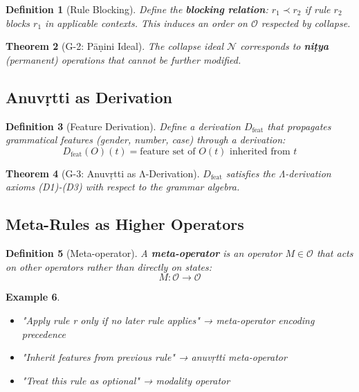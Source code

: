 \documentclass[12pt, oneside]{article}
\newtheorem{theorem}{Theorem}[section]
\newtheorem{definition}[theorem]{Definition}
\newtheorem{example}[theorem]{Example}
\newcommand{\N}{\mathcal{N}}
\newcommand{\Opr}{\mathcal{O}}
\begin{document}
\begin{definition}[Rule Blocking]
Define the \textbf{blocking relation}: $r_1 \prec r_2$ if rule $r_2$ blocks $r_1$ in applicable contexts. This induces an order on $\Opr$ respected by collapse.
\end{definition}

\begin{theorem}[G-2: Pāṇini Ideal]
The collapse ideal $\N$ corresponds to \textbf{niṭya} (permanent) operations that cannot be further modified.
\end{theorem}

\subsection{Anuvṛtti as Derivation}

\begin{definition}[Feature Derivation]
Define a derivation $D_{\text{feat}}$ that propagates grammatical features (gender, number, case) through a derivation:
\begin{equation}
D_{\text{feat}}(O)(t) = \text{feature set of } O(t) \text{ inherited from } t
\end{equation}
\end{definition}

\begin{theorem}[G-3: Anuvṛtti as Λ-Derivation]
$D_{\text{feat}}$ satisfies the Λ-derivation axioms (D1)-(D3) with respect to the grammar algebra.
\end{theorem}

\subsection{Meta-Rules as Higher Operators}

\begin{definition}[Meta-operator]
A \textbf{meta-operator} is an operator $M \in \Opr$ that acts on other operators rather than directly on states:
\begin{equation}
M: \Opr \rightarrow \Opr
\end{equation}
\end{definition}

\begin{example}
\begin{itemize}
    \item "Apply rule r only if no later rule applies" → meta-operator encoding precedence
    \item "Inherit features from previous rule" → anuvṛtti meta-operator
    \item "Treat this rule as optional" → modality operator
\end{itemize}
\end{example}
\end{document}
